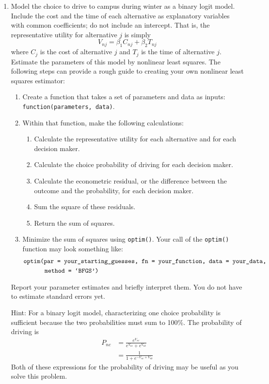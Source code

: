 \documentclass[11pt,letterpaper]{article}\usepackage[]{graphicx}\usepackage[]{color}
\begin{document}
\begin{enumerate}[label=\alph*., leftmargin=*]
	\item Model the choice to drive to campus during winter as a binary logit model. Include the cost and the time of each alternative as explanatory variables with common coefficients; do not include an intercept. That is, the representative utility for alternative $j$ is simply
	$$V_{nj} = \beta_1 C_{nj} + \beta_2 T_{nj}$$
	where $C_j$ is the cost of alternative $j$ and $T_j$ is the time of alternative $j$. Estimate the parameters of this model by nonlinear least squares. The following steps can provide a rough guide to creating your own nonlinear least squares estimator:
	\begin{enumerate}[label=\Roman*.]
		\item Create a function that takes a set of parameters and data as inputs: \texttt{function(parameters, data)}.
		\item Within that function, make the following calculations:
		\begin{enumerate}[label=\roman*.]
			\item Calculate the representative utility for each alternative and for each decision maker.
			\item Calculate the choice probability of driving for each decision maker.
			\item Calculate the econometric residual, or the difference between the outcome and the probability, for each decision maker.
			\item Sum the square of these residuals.
			\item Return the sum of squares.
		\end{enumerate}
		\item Minimize the sum of squares using \texttt{optim()}. Your call of the \texttt{optim()} function may look something like:
		\begin{align*}
			&\text{\texttt{optim(par = your\_starting\_guesses, fn = your\_function, data = your\_data,}} \\
			& \qquad \quad \; \text{\texttt{method = `BFGS')}}
		\end{align*}
	\end{enumerate}
	Report your parameter estimates and briefly interpret them. You do not have to estimate standard errors yet.

	Hint: For a binary logit model, characterizing one choice probability is sufficient because the two probabilities must sum to 100\%. The probability of driving is
	\begin{align*}
		P_{nc} &= \frac{e^{V_{nc}}}{e^{V_{nc}} + e^{V_{nb}}} \\
		&= \frac{1}{1 + e^{-V_{nc} + V_{nb}}}
	\end{align*}
	Both of these expressions for the probability of driving may be useful as you solve this problem.


\end{enumerate}
\end{document}
